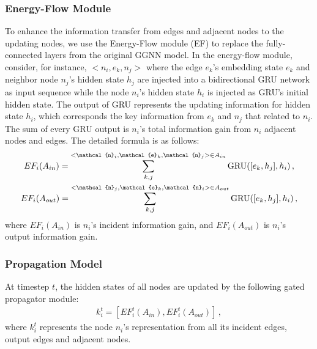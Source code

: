 \documentclass[letterpaper]{article} %
\begin{document}
\subsubsection{Energy-Flow Module}
To enhance the information transfer from edges and adjacent nodes to the updating nodes, we use the Energy-Flow module (EF) to replace the fully-connected layers from the original GGNN model. 
In the energy-flow module, consider, for instance, $<{n}_i, {e}_k, {n}_j>$ where the edge ${e}_k$'s embedding state $e_k$ and neighbor node ${n}_j$'s hidden state $h_j$ are injected into a bidirectional GRU network as input sequence while the node ${n}_i$'s hidden state $h_i$ is injected as GRU's initial hidden state. 
The output of GRU represents the updating information for hidden state $h_i$, which corresponds the key information from ${e}_k$ and ${n}_j$ that related to ${n}_i$. 
The sum of every GRU output is ${n}_i$'s total information gain from ${n}_i$ adjacent nodes and edges. 
The detailed formula is as follows:
\begin{gather}\notag
    EF_i(A_{in}) = \sum\limits_{k,j}^{<\mathcal{n}_i,\mathcal{e}_k,\mathcal{n}_j>\in A_{in}} \text{GRU}([e_k, h_j], h_i) \, , \\ \notag
    EF_i(A_{out}) = \sum\limits_{k,j}^{<\mathcal{n}_j,\mathcal{e}_k,\mathcal{n}_i>\in A_{out}} \text{GRU}([e_k, h_j], h_i) \, ,\notag
\end{gather}
where $EF_i(A_{in})$ is ${n}_i$'s incident information gain, and  $EF_i(A_{out})$ is ${n}_i$'s output information gain.

\subsubsection{Propagation Model}

At timestep $t$, the hidden states of all nodes are updated by the following gated propagator module:
\begin{gather}
    k_{i}^t = [EF_i^t(A_{in}), EF_i^t(A_{out})] \, ,
\end{gather}
where $k_{i}^t$ represents the node ${n}_i$'s representation from all its incident edges, output edges and adjacent nodes.
\end{document}
